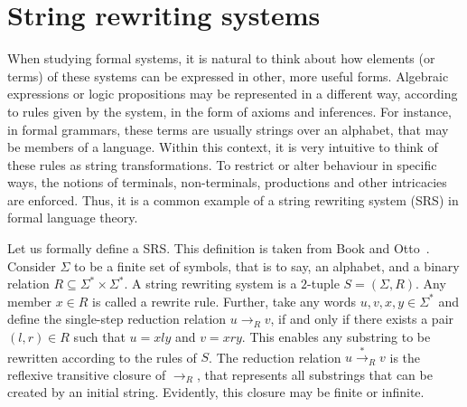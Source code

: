 \documentclass[12pt]{article}
\begin{document}

\section{String rewriting systems}\label{sec:srs}

When studying formal systems, it is natural to think about how elements (or terms) of these systems can be expressed in other, more useful forms. Algebraic expressions or logic propositions may be represented in a different way, according to rules given by the system, in the form of axioms and inferences. For instance, in formal grammars, these terms are usually strings over an alphabet, that may be members of a language. Within this context, it is very intuitive to think of these rules as string transformations. To restrict or alter behaviour in specific ways, the notions of terminals, non-terminals, productions and other intricacies are enforced. Thus, it is a common example of a string rewriting system (SRS) in formal language theory.

Let us formally define a SRS. This definition is taken from Book and Otto~\cite[Sec. 2.1]{Book:book:1993}. Consider $\Sigma$ to be a finite set of symbols, that is to say, an alphabet, and a binary relation $R \subseteq \Sigma^{*} \times \Sigma^{*}$. A string rewriting system is a $2$-tuple $S = (\Sigma, R)$. Any member $x \in R$ is called a rewrite rule. Further, take any words $u, v, x, y \in \Sigma^{*}$ and define the single-step reduction relation $u \rightarrow_{R} v$, if and only if there exists a pair $(l, r) \in R$ such that $u = xly$ and $v = xry$. This enables any substring to be rewritten according to the rules of $S$. The reduction relation $u \stackrel{*}{\rightarrow}_{R} v$ is the reflexive transitive closure of $\rightarrow_{R}$, that represents all substrings that can be created by an initial string. Evidently, this closure may be finite or infinite.
\end{document}
